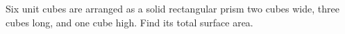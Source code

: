 Six unit cubes are arranged as a solid rectangular prism two cubes wide, three cubes long, and one cube high. Find its total surface area.
